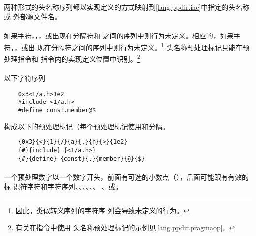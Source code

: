 {\semantic
\paragraph{}
两种形式的头名称序列都以实现定义的方式映射到\ref{lang.ppdir.inc}中指定的头名称或
外部源文件名。

\paragraph{}
如果字符\tm{\sq}，\tm{\bs}，\tm{\dq}，\tm{//}或\tm{/*}出现在分隔符\tm{<}和\tm{>}
之间的序列中则行为未定义。相应的，如果字符\tm{\sq}，\tm{\bs}，\tm{//}或\tm{/*}出
现在\tm{\dq}分隔符之间的序列中则行为未定义。\footnote{因此，类似转义序列的字符序
列会导致未定义的行为。} 头名称预处理标记只能在预处理指令和
指令内的实现定义位置中识别。\footnote{有关在指令中使用
头名称预处理标记的示例见\ref{lang.ppdir.pragmaop}。}

\paragraph{}
\ex* 以下字符序列
\begin{lstlisting}
    0x3<1/a.h>1e2
    #include <1/a.h>
    #define const.member@$
\end{lstlisting}
构成以下的预处理标记（每个预处理标记使用\tm{\{}和\tm{\}}分隔。
\begin{lstlisting}
    {0x3}{<}{1}{/}{a}{.}{h}{>}{1e2}
    {#}{include} {<1/a.h>}
    {#}{define} {const}{.}{member}{@}{$}
\end{lstlisting}


\syntax
\paragraph{}

\desc
\paragraph{}
一个预处理数字以一个数字开头，前面有可选的小数点（），后面可能跟有有效的标
识符字符和字符序列、、、、、、
、或。

}
